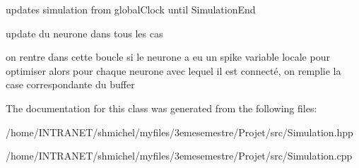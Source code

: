 updates simulation from global\-Clock until Simulation\-End 

update du neurone dans tous les cas

on rentre dans cette boucle si le neurone a eu un spike variable locale pour optimiser alors pour chaque neurone avec lequel il est connecté, on remplie la case correspondante du buffer 

The documentation for this class was generated from the following files\-:\begin{DoxyCompactItemize}
\item 
/home/\-I\-N\-T\-R\-A\-N\-E\-T/shmichel/myfiles/3emesemestre/\-Projet/src/Simulation.\-hpp\item 
/home/\-I\-N\-T\-R\-A\-N\-E\-T/shmichel/myfiles/3emesemestre/\-Projet/src/Simulation.\-cpp\end{DoxyCompactItemize}
